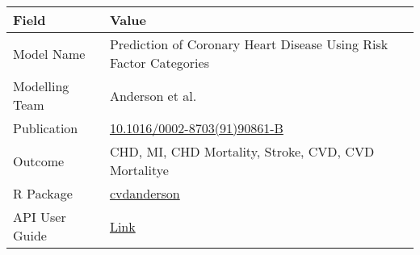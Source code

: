 \documentclass[
]{book}
\begin{document}
\begin{longtable}[]{@{}ll@{}}
\toprule
\begin{minipage}[b]{0.45\columnwidth}\raggedright
Field\strut
\end{minipage} & \begin{minipage}[b]{0.49\columnwidth}\raggedright
Value\strut
\end{minipage}\tabularnewline
\midrule
\endhead
\begin{minipage}[t]{0.45\columnwidth}\raggedright
Model Name\strut
\end{minipage} & \begin{minipage}[t]{0.49\columnwidth}\raggedright
Prediction of Coronary Heart Disease Using Risk Factor Categories\strut
\end{minipage}\tabularnewline
\begin{minipage}[t]{0.45\columnwidth}\raggedright
Modelling Team\strut
\end{minipage} & \begin{minipage}[t]{0.49\columnwidth}\raggedright
Anderson et al.\strut
\end{minipage}\tabularnewline
\begin{minipage}[t]{0.45\columnwidth}\raggedright
Publication\strut
\end{minipage} & \begin{minipage}[t]{0.49\columnwidth}\raggedright
\href{https://doi.org/10.1016/0002-8703(91)90861-B}{10.1016/0002-8703(91)90861-B}\strut
\end{minipage}\tabularnewline
\begin{minipage}[t]{0.45\columnwidth}\raggedright
Outcome\strut
\end{minipage} & \begin{minipage}[t]{0.49\columnwidth}\raggedright
CHD, MI, CHD Mortality, Stroke, CVD, CVD Mortalitye\strut
\end{minipage}\tabularnewline
\begin{minipage}[t]{0.45\columnwidth}\raggedright
R Package\strut
\end{minipage} & \begin{minipage}[t]{0.49\columnwidth}\raggedright
\href{https://github.com/resplab/cvdanderson}{cvdanderson}\strut
\end{minipage}\tabularnewline
\begin{minipage}[t]{0.45\columnwidth}\raggedright
API User Guide\strut
\end{minipage} & \begin{minipage}[t]{0.49\columnwidth}\raggedright
\href{https://resplab.github.io/prismguide/api-users-guide.html\#cvdanderson-1}{Link}\strut
\end{minipage}\tabularnewline
\bottomrule
\end{longtable}
\end{document}
